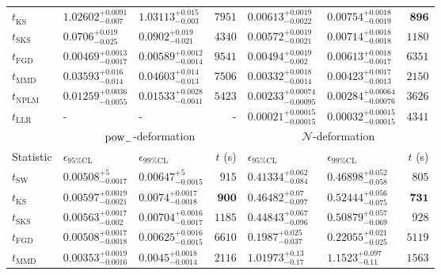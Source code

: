 \begin{tabular}{l|llr|llr}
	$t_{\overline{\mathrm{KS}}}$ & $1.02602_{-0.007}^{+0.0091}$ & $1.03113_{-0.003}^{+0.015}$ & $7951$ & $0.00613_{-0.0022}^{+0.0019}$ & $0.00754_{-0.0019}^{+0.0018}$ & ${\mathbf{896}}$ \\
	$t_{\mathrm{SKS}}$ & $0.0706_{-0.025}^{+0.019}$ & $0.0902_{-0.021}^{+0.019}$ & $4340$ & $0.00572_{-0.0021}^{+0.0019}$ & $0.00714_{-0.0018}^{+0.0018}$ & $1180$ \\
	$t_{\mathrm{FGD}}$ & ${\mathbf{0.00469_{-0.0017}^{+0.0013}}}$ & ${\mathbf{0.00589_{-0.0014}^{+0.0012}}}$ & $9541$ & $0.00494_{-0.002}^{+0.0019}$ & $0.00613_{-0.0017}^{+0.0018}$ & $6351$ \\
	$t_{\mathrm{MMD}}$ & $0.03593_{-0.014}^{+0.016}$ & $0.04603_{-0.013}^{+0.014}$ & $7506$ & ${\mathbf{0.00332_{-0.0014}^{+0.0018}}}$ & ${\mathbf{0.00423_{-0.0013}^{+0.0017}}}$ & $2150$ \\
\rowcolor{red!35}	$t_{\mathrm{NPLM}}$ & $0.01259_{-0.0055}^{+0.0036}$ & $0.01533_{-0.0041}^{+0.0028}$ & $5423$ & $0.00233_{-0.00095}^{+0.00074}$ & $0.00284_{-0.00076}^{+0.00064}$ & $3626$ \\
	$t_{\mathrm{LLR}}$ & - & - & - & $0.00021_{-0.00015}^{+0.00015}$ & $0.00032_{-0.00015}^{+0.00015}$ & $4341$ \\
	\toprule
	\multicolumn{1}{c}{} & \multicolumn{3}{c}{$\rm{pow}_{-}$-deformation} & \multicolumn{3}{c}{$\mathcal{N}$-deformation} \\
	Statistic & $\epsilon_{95\%\mathrm{CL}}$ & $\epsilon_{99\%\mathrm{CL}}$ & $t$ (s) & $\epsilon_{95\%\mathrm{CL}}$ & $\epsilon_{99\%\mathrm{CL}}$ & $t$ (s) \\
	\midrule
	$t_{\mathrm{SW}}$ & $0.00508_{-0.0017}^{+5}$ & $0.00647_{-0.0015}^{+5}$ & $915$ & $0.41334_{-0.084}^{+0.062}$ & $0.46898_{-0.058}^{+0.052}$ & $805$ \\
	$t_{\overline{\mathrm{KS}}}$ & $0.00597_{-0.0021}^{+0.0019}$ & $0.0074_{-0.0018}^{+0.0017}$ & ${\mathbf{900}}$ & $0.46482_{-0.097}^{+0.07}$ & $0.52444_{-0.075}^{+0.056}$ & ${\mathbf{731}}$ \\
	$t_{\mathrm{SKS}}$ & $0.00563_{-0.002}^{+0.0017}$ & $0.00704_{-0.0017}^{+0.0016}$ & $1185$ & $0.44843_{-0.096}^{+0.067}$ & $0.50879_{-0.069}^{+0.057}$ & $928$ \\
	$t_{\mathrm{FGD}}$ & $0.00508_{-0.0018}^{+0.0017}$ & $0.00625_{-0.0015}^{+0.0016}$ & $6610$ & ${\mathbf{0.1987_{-0.037}^{+0.025}}}$ & ${\mathbf{0.22055_{-0.025}^{+0.021}}}$ & $5119$ \\
	$t_{\mathrm{MMD}}$ & ${\mathbf{0.00353_{-0.0016}^{+0.0019}}}$ & ${\mathbf{0.0045_{-0.0014}^{+0.0018}}}$ & $2116$ & $1.01973_{-0.17}^{+0.13}$ & $1.1523_{-0.11}^{+0.097}$ & $1563$ \\

\end{tabular}
